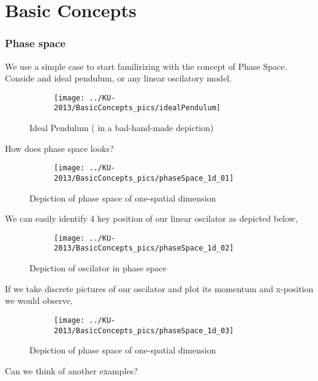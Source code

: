 \section{Basic Concepts}

\begin{frame} \frametitle{Phase space}
We use a simple case to start familirizing with the concept of Phase Space. 
Conside and ideal pendulum, or any linear oscilatory model.
 \begin{figure}
        \centering
        \begin{subfigure}[b]{0.60\textwidth}
                \centering
                \texttt{[image: ../KU-2013/BasicConcepts\_pics/idealPendulum]}
        \end{subfigure}%
        \caption{Ideal Pendulum ( in a bad-hand-made depiction)}
        \label{fig:idealPendulum}
 \end{figure}
\end{frame}

\begin{frame}
How does phase space looks?
 \begin{figure}
        \centering
        \begin{subfigure}[b]{0.60\textwidth}
                \centering
                \texttt{[image: ../KU-2013/BasicConcepts\_pics/phaseSpace\_1d\_01]}
        \end{subfigure}%
        \caption{Depiction of phase space of one-spatial dimension}
        \label{fig:phaseSpace_1d_01}
 \end{figure}
\end{frame}

\begin{frame}
We can easily identify 4 key position of our linear oscilator as depicted below,
 \begin{figure}
        \centering
        \begin{subfigure}[b]{0.60\textwidth}
                \centering
                \texttt{[image: ../KU-2013/BasicConcepts\_pics/phaseSpace\_1d\_02]}
        \end{subfigure}%
        \caption{Depiction of oscilator in phase space}
        \label{fig:phaseSpace_1d_02}
 \end{figure}
\end{frame}

\begin{frame}
If we take discrete pictures of our oscilator and plot its momentum and x-position we would observe,
 \begin{figure}
        \centering
        \begin{subfigure}[b]{0.60\textwidth}
                \centering
                \texttt{[image: ../KU-2013/BasicConcepts\_pics/phaseSpace\_1d\_03]}
        \end{subfigure}%
        \caption{Depiction of phase space of one-spatial dimension}
        \label{fig:phaseSpace_1d_03}
 \end{figure}
 Can we think of another examples?
\end{frame}


